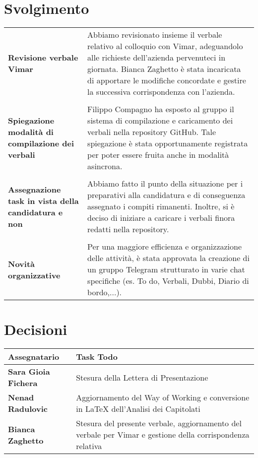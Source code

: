 \documentclass[a4paper,12pt]{article}
\begin{document}
\section{Svolgimento}
\begin{longtable}{P{5cm}|P{10cm}} 
\textbf{Revisione verbale Vimar} & Abbiamo revisionato insieme il verbale relativo al colloquio con Vimar, adeguandolo alle richieste dell'azienda pervenuteci in giornata. Bianca Zaghetto è stata incaricata di apportare le modifiche concordate e gestire la successiva corrispondenza con l'azienda.\\
\\
\textbf{Spiegazione modalità di compilazione dei verbali} & Filippo Compagno ha esposto al gruppo il sistema di compilazione e caricamento dei verbali nella repository GitHub. Tale spiegazione è stata opportunamente registrata per poter essere fruita anche in modalità asincrona. \\
\\
\textbf{Assegnazione task in vista della candidatura e non} & Abbiamo fatto il punto della situazione per i preparativi alla candidatura e di conseguenza assegnato i compiti rimanenti. Inoltre, si è deciso di iniziare a caricare i verbali finora redatti nella repository.\\
\\
\textbf{Novità organizzative} & Per una maggiore efficienza e organizzazione delle attività, è stata approvata la creazione di un gruppo Telegram strutturato in varie chat specifiche (es. To do, Verbali, Dubbi, Diario di bordo,...).\\
\end{longtable}

\section{Decisioni}

\begin{tabularx}{\textwidth}{|l|X|}
\hline
\textbf{Assegnatario} & \textbf{Task Todo} \\
\hline
\textbf{Sara Gioia Fichera} & Stesura della Lettera di Presentazione \\
\hline
\textbf{Nenad Radulovic} & Aggiornamento del Way of Working e conversione in LaTeX dell'Analisi dei Capitolati \\
\hline
\textbf{Bianca Zaghetto} & Stesura del presente verbale, aggiornamento del verbale per Vimar e gestione della corrispondenza relativa \\
\hline

\end{tabularx}
\end{document}
